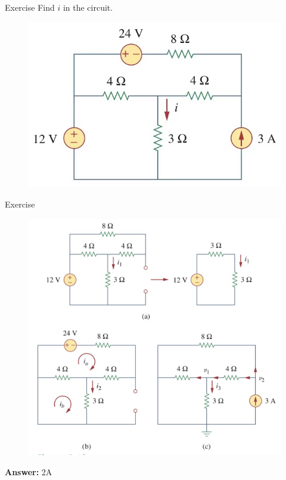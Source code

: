 \documentclass{beamer}
\begin{document}

\begin{frame}{Exercise}
Find $i$ in the circuit.
\begin{figure}
\centering
\includegraphics[scale=0.4]{img_cir/4.jpg}
\end{figure}
\end{frame}


\begin{frame}{Exercise}
\begin{figure}
\centering
\includegraphics[scale=0.2]{img_cir/3.jpg}
\end{figure}
\textbf{Answer:} 2A
\end{frame}
\end{document}
